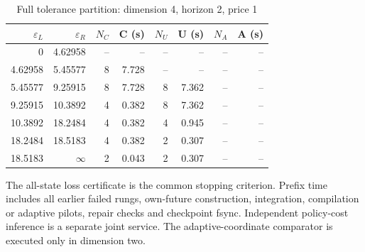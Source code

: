 \begin{table}[htbp]
\centering
\caption{Full tolerance partition: dimension 4, horizon 2, price 1}\label{tab:frontier-full48-4-2-1}
\footnotesize
\begin{tabular}{rrrrrrrr}
\toprule
$\varepsilon_L$ & $\varepsilon_R$ & $N_C$ & C (s) & $N_U$ & U (s) & $N_A$ & A (s)\\
\midrule
0 & 4.62958 & -- & -- & -- & -- & -- & -- \\
4.62958 & 5.45577 & 8 & 7.728 & -- & -- & -- & -- \\
5.45577 & 9.25915 & 8 & 7.728 & 8 & 7.362 & -- & -- \\
9.25915 & 10.3892 & 4 & 0.382 & 8 & 7.362 & -- & -- \\
10.3892 & 18.2484 & 4 & 0.382 & 4 & 0.945 & -- & -- \\
18.2484 & 18.5183 & 4 & 0.382 & 2 & 0.307 & -- & -- \\
18.5183 & $\infty$ & 2 & 0.043 & 2 & 0.307 & -- & -- \\
\bottomrule
\end{tabular}
\begin{minipage}{0.97\linewidth}\footnotesize\vspace{3pt}
The all-state loss certificate is the common stopping criterion. Prefix time includes all earlier failed rungs, own-future construction, integration, compilation or adaptive pilots, repair checks and checkpoint fsync. Independent policy-cost inference is a separate joint service. The adaptive-coordinate comparator is executed only in dimension two.
\end{minipage}
\end{table}
